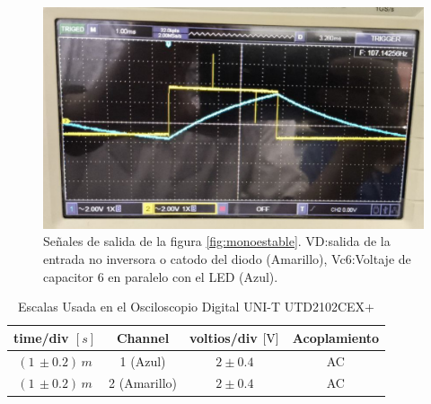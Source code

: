             
            \begin{figure}[H]
                \centering
                \renewcommand{\figurename}{Imagen}
                \includegraphics[width=15cm]{Imagenes/exp_monoestable_vd_vcmage 2024-02-08 at 11.29.33_3958794e.png}
                \caption{Señales de salida de la figura \ref{fig:monoestable}. VD:salida de la entrada no inversora o catodo del diodo (Amarillo), Vc6:Voltaje de capacitor 6 en paralelo con el LED (Azul).}
                \label{fig:exp_monoestable_vcat_vc}
            \end{figure}

            \begin{table}[H]
                \centering
                \begin{tabular}{|c|c|c|c|}
                    \hline
                    \textbf{time/div} $[s]$ & \textbf{Channel} & \textbf{voltios/div $[\volt]$} & \textbf{Acoplamiento} \\ \hline
                    $(1 \, \pm 0.2) \, m  $ & 1 (Azul)  &   $2 \pm 0.4   $ & AC \\ \hline  
                    $(1 \, \pm 0.2) \, m  $ & 2 (Amarillo)  &   $2 \pm 0.4   $ & AC \\ \hline  
                \end{tabular}
                \caption{Escalas Usada en el Osciloscopio Digital UNI-T UTD2102CEX+}
                \label{tab:escala_monoestable_vcat_vc}
            \end{table}

